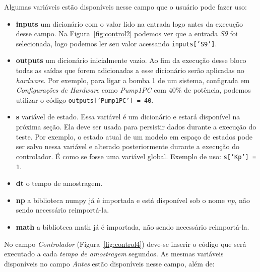 Algumas variáveis estão disponíveis nesse campo que o usuário pode fazer uso:

\begin{itemize}
    \item \textbf{inputs} um dicionário com o valor lido na entrada logo antes
                          da execução desse campo. Na Figura~\ref{fig:control2}
                          podemos ver que a entrada \textit{S9} foi selecionada,
                          logo podemos ler seu valor acessando
                          \texttt{inputs['S9']}.
    \item \textbf{outputs} um dicionário inicialmente vazio. Ao fim da execução
                           desse bloco todas as saídas que forem adicionadas a
                           esse dicionário serão aplicadas no \textit{hardware}.
                           Por exemplo, para ligar a bomba 1 de um sistema,
                           configrada em \textit{Configurações de Hardware} como
                           \textit{Pump1PC} com 40\% de potência, podemos
                           utilizar o código
                           \texttt{outputs['Pump1PC'] = 40}.
    \item \textbf{s} variável de estado. Essa variável é um dicionário e estará
                     disponível na próxima seção. Ela deve ser usada para
                     persistir dados durante a execução do teste. Por exemplo, o
                     estado atual de um modelo em espaço de estados pode ser
                     salvo nessa variável e alterado posteriormente durante a
                     execução do controlador. É como se fosse uma variável
                     global. Exemplo de uso: \texttt{s['Kp'] = 1}.
    \item \textbf{dt} o tempo de amostragem.
    \item \textbf{np} a biblioteca numpy já é importada e está disponível sob o
                      nome \textit{np}, não sendo necessário reimportá-la.
    \item \textbf{math} a biblioteca math já é importada, não sendo necessário
                        reimportá-la.
\end{itemize}

No campo \textit{Controlador} (Figura~\ref{fig:control4}) deve-se inserir o
código que será executado a cada \textit{tempo de amostragem} segundos. As
mesmas variáveis disponíveis no campo \textit{Antes} estão disponíveis nesse
campo, além de:

